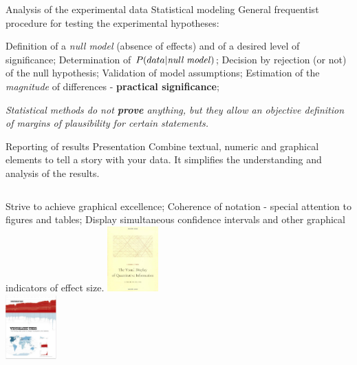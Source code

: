 \documentclass[t]{beamer}
\begin{document}

\begin{ftst}
{Analysis of the experimental data}
{Statistical modeling}
\bitems General frequentist procedure for testing the experimental hypotheses:

	\bitems Definition of a \textit{null model} (absence of effects) and of a desired level of significance;
		\spitem Determination of $P(data|\mbox{\textit{null model}})$;
		\spitem Decision by rejection (or not) of the null hypothesis;
		\spitem Validation of model assumptions;
		\spitem Estimation of the  \textit{magnitude} of differences - \textbf{practical significance};
	\eitem
\eitem

\begin{block}{}
	\centering\textit{Statistical methods do not \textbf{prove} anything, but they allow an objective definition of margins of plausibility for certain statements.}
\end{block}
\end{ftst}


\begin{ftst}
{Reporting of results}
{Presentation}
Combine textual, numeric and graphical elements to tell a story with your data. It simplifies the understanding and analysis of the results.
\begin{columns}[T]
	\bitems Strive to achieve graphical excellence;
		\spitem Coherence of notation - special attention to figures and tables;
		\spitem Display simultaneous confidence intervals and other graphical indicators of effect size.
	\eitem
{}
	\centering\includegraphics[height=2.5cm]{../figs/tufte.jpg}\\
	\vone
	\centering\includegraphics[height=2.5cm]{../figs/yau.png}
\end{columns}
\end{ftst}
\end{document}
